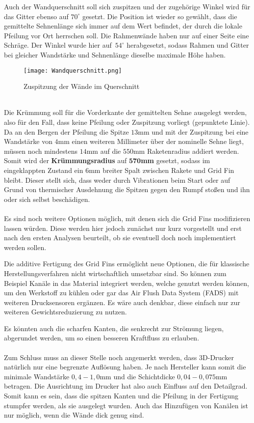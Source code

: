 Auch der Wandquerschnitt soll sich zuspitzen und der zugehörige Winkel wird für das Gitter ebenso auf $70^\circ$ gesetzt. Die Position ist wieder so gewählt, dass die gemittelte Sehnenlänge sich immer auf dem Wert befindet, der durch die lokale Pfeilung vor Ort herrschen soll. Die Rahmenwände haben nur auf einer Seite eine Schräge. Der Winkel wurde hier auf\ $54^\circ$ herabgesetzt, sodass Rahmen und Gitter bei gleicher Wandstärke und Sehnenlänge dieselbe maximale Höhe haben.
\begin{figure}
	\centering
	\texttt{[image: Wandquerschnitt.png]}
	\caption{Zuspitzung der Wände im Querschnitt}
\end{figure}\\
Die Krümmung soll für die Vorderkante der gemittelten Sehne ausgelegt werden, also für den Fall, dass keine Pfeilung oder Zuspitzung vorliegt (gepunktete Linie). Da an den Bergen der Pfeilung die Spitze $13$mm und mit der Zuspitzung bei eine Wandstärke von $4$mm einen weiteren Millimeter über der nominelle Sehne liegt, müssen noch mindestens $14$mm auf die $550$mm Raketenradius addiert werden. Somit wird der \textbf{Krümmungsradius} auf $\mathbf{570}$\textbf{mm} gesetzt, sodass im eingeklappten Zustand ein $6$mm breiter Spalt zwischen Rakete und Grid Fin bleibt. Dieser stellt sich, dass weder durch Vibrationen beim Start oder auf Grund von thermischer Ausdehnung die Spitzen gegen den Rumpf stoßen und ihn oder sich selbst beschädigen.
\\~\\
Es sind noch weitere Optionen möglich, mit denen sich die Grid Fins modifizieren lassen würden. Diese werden hier jedoch zunächst nur kurz vorgestellt und erst nach den ersten Analysen beurteilt, ob sie eventuell doch noch implementiert werden sollen.

Die additive Fertigung des Grid Fins ermöglicht neue Optionen, die für klassische Herstellungsverfahren nicht wirtschaftlich umsetzbar sind. So können zum Beispiel Kanäle in das Material integriert werden, welche genutzt werden können, um den Werkstoff zu kühlen oder gar das Air Flush Data System (FADS) mit weiteren Drucksensoren ergänzen. Es wäre auch denkbar, diese einfach nur zur weiteren Gewichtsreduzierung zu nutzen.

Es könnten auch die scharfen Kanten, die senkrecht zur Strömung liegen, abgerundet werden, um so einen besseren Kraftfluss zu erlauben.
\\~\\
Zum Schluss muss an dieser Stelle noch angemerkt werden, dass 3D-Drucker natürlich nur eine begrenzte Auflösung haben. Je nach Hersteller kann somit die minimale Wandstärke $0,4-1,0$mm \cite{eos, preise} und die Schichtdicke $0,04-0,075$mm \cite{preise} betragen. Die Ausrichtung im Drucker hat also auch Einfluss auf den Detailgrad. Somit kann es sein, dass die spitzen Kanten und die Pfeilung in der Fertigung stumpfer werden, als sie ausgelegt wurden. Auch das Hinzufügen von Kanälen ist nur möglich, wenn die Wände dick genug sind.
